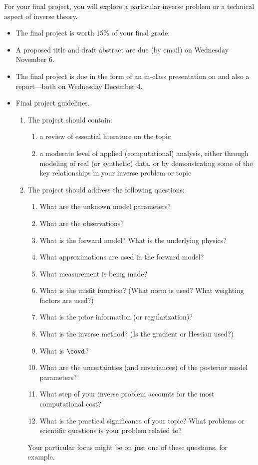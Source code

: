 \documentclass[11pt,titlepage,fleqn]{article}
\begin{document}
For your final project, you will explore a particular inverse problem or a technical aspect of inverse theory.
%
\begin{itemize}
\item The final project is worth 15\% of your final grade.
\item A proposed title and draft abstract are due (by email) on Wednesday November 6.
\item The final project is due in the form of an in-class presentation on and also a report---both on Wednesday December 4.

\item Final project guidelines.
%
\begin{enumerate}
\item The project should contain:
%
\begin{enumerate}
\item a review of essential literature on the topic
\item a moderate level of applied (computational) analysis, either through modeling of real (or synthetic) data, or by demonstrating some of the key relationships in your inverse problem or topic
\end{enumerate}

\item The project should address the following questions:
%
\begin{enumerate}
\item What are the unknown model parameters?
\item What are the observations?
\item What is the forward model? What is the underlying physics?
\item What approximations are used in the forward model?
\item What measurement is being made?
\item What is the misfit function? (What norm is used? What weighting factors are used?)
\item What is the prior information (or regularization)?
\item What is the inverse method? (Is the gradient or Hessian used?)
\item What is $\covd$?
\item What are the uncertainties (and covariances) of the posterior model parameters?
\item What step of your inverse problem accounts for the most computational cost?
\item What is the practical significance of your topic? What problems or scientific questions is your problem related to?
\end{enumerate}
%
Your particular focus might be on just one of these questions, for example.


\end{enumerate}
\end{itemize}
\end{document}
